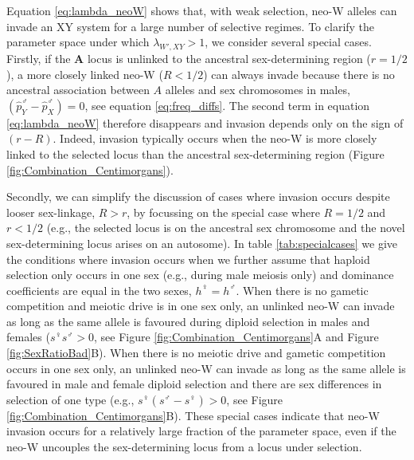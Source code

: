 \documentclass[12pt]{article}
\begin{document}
Equation \eqref{eq:lambda_neoW} shows that, with weak selection, neo-W alleles can invade an XY system for a large number of selective regimes. 
To clarify the parameter space under which $\lambda_{W',XY}>1$, we consider several special cases. 
Firstly, if the \textbf{A} locus is unlinked to the ancestral sex-determining region ($r=1/2$), a more closely linked neo-W ($R<1/2$) can always invade because there is no ancestral association between $A$ alleles and sex chromosomes in males, $\left( \hat{p}^\male_Y-\hat{p}^\male_X \right)=0$, see equation \eqref{eq:freq_diffs}. 
The second term in equation \eqref{eq:lambda_neoW} therefore disappears and invasion depends only on the sign of $(r-R)$. 
Indeed, invasion typically occurs when the neo-W is more closely linked to the selected locus than the ancestral sex-determining region (Figure \ref{fig:Combination_Centimorgans}).

Secondly, we can simplify the discussion of cases where invasion occurs despite looser sex-linkage, $R>r$, by focussing on the special case where $R=1/2$ and $r<1/2$ (e.g., the selected locus is on the ancestral sex chromosome and the novel sex-determining locus arises on an autosome). 
In table \ref{tab:specialcases} we give the conditions where invasion occurs when we further assume that haploid selection only occurs in one sex (e.g., during male meiosis only) and dominance coefficients are equal in the two sexes, $h^\female=h^\male$. 
When there is no gametic competition and meiotic drive is in one sex only, an unlinked neo-W can invade as long as the same allele is favoured during diploid selection in males and females ($s^\female s^\male>0$, see Figure \ref{fig:Combination_Centimorgans}A and Figure \ref{fig:SexRatioBad}B). %
When there is no meiotic drive and gametic competition occurs in one sex only, an unlinked neo-W can invade as long as the same allele is favoured in male and female diploid selection and there are sex differences in selection of one type (e.g., $s^\female(s^\male-s^\female)>0$, see Figure \ref{fig:Combination_Centimorgans}B). %
These special cases indicate that neo-W invasion occurs for a relatively large fraction of the parameter space, even if the neo-W uncouples the sex-determining locus from a locus under selection. 
\end{document}
